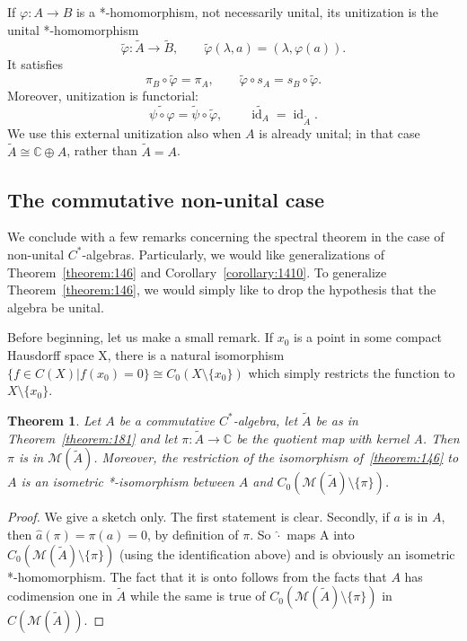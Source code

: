 \documentclass{book}
\newtheorem{theorem}[definition]{Theorem}
\def\cstar{\(C^*\)-algebra}
\def\cstars{\(C^*\)-algebras}
\begin{document}
If \(\varphi:A\to B\) is a *-homomorphism, not necessarily unital, its
\textnormal{unitization} is the unital *-homomorphism
\[
  \tilde{\varphi}:\tilde{A}\to\tilde{B},
  \qquad \tilde{\varphi}(\lambda,a)=(\lambda,\varphi(a)).
\]
It satisfies
\[
  \pi_B\circ\tilde{\varphi}=\pi_A,
  \qquad
  \tilde{\varphi}\circ s_A=s_B\circ\tilde{\varphi}.
\]
Moreover, unitization is functorial:
\[
  \widetilde{\psi\circ\varphi}=\tilde{\psi}\circ\tilde{\varphi},
  \qquad
  \widetilde{\operatorname{id}_A}=\operatorname{id}_{\tilde{A}}.
\]
We use this external unitization also when \(A\) is already unital; in that
case \(\tilde{A}\cong\mathbb{C}\oplus A\), rather than \(\tilde{A}=A\).

\subsection{The commutative non-unital case}
We conclude with a few remarks concerning the spectral theorem in the
case of non-unital \cstars. Particularly, we would like generalizations of
Theorem~\ref{theorem:146} and Corollary~\ref{corollary:1410}. To generalize Theorem~\ref{theorem:146}, we would
simply like to drop the hypothesis that the algebra be unital.\par
Before beginning, let us make a small remark. If \(x_0\) is a point in some
compact Hausdorff space X, there is a natural isomorphism \(\{f \in C(X) | f(
x_0) = 0\} \cong  C_0(X \setminus \{x_0\})\) which simply restricts the function to \(X \setminus \{x_0\}\).
\begin{theorem}
  Let \(A\) be a commutative \cstar, let \(\tilde{A}\) be as in Theorem~\ref{theorem:181} and let \(\pi : \tilde{A} \rightarrow \mathbb C\)
  be the quotient map with kernel A. Then \(\pi\) is in
  \(\mathcal{M}(\tilde{A})\). Moreover, the restriction of the isomorphism of~\ref{theorem:146} to \(A\) is an
  isometric *-isomorphism between \(A\) and \(C_0(\mathcal{M}(\tilde{A}) \setminus \{\pi\})\).
\end{theorem}
\begin{proof}
  We give a sketch only. The first statement is clear. Secondly, if
  \(a\) is in \(A\), then \(\hat{a} (\pi) = \pi(a) = 0\), by definition of \(\pi\). So \(\hat{\cdot}\) maps A into
  \(C_0(\mathcal{M}(\tilde{A}) \setminus \{\pi\})\) (using the identification above) and is obviously an 
  isometric *-homomorphism. The fact that it is onto follows from the facts that
  \(A\) has codimension one in \(\tilde{A}\) while the same is true of \(C_0(\mathcal{M}(\tilde{A}) \setminus \{\pi\})\) in
  \(C(\mathcal{M}(\tilde{A}))\).
\end{proof}
\end{document}
